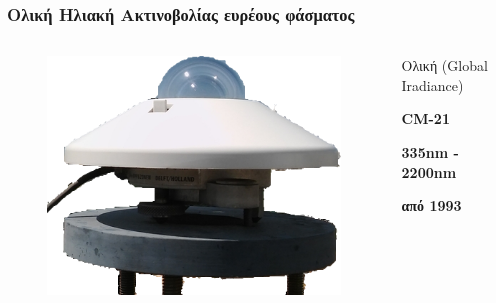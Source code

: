 \documentclass[hyperref={pdfpagelabels=false}]{beamer}
\newenvironment{topcolumns}{\begin{columns}[t]}{\end{columns}}
\begin{document}
\begin{frame}%
\frametitle{Ολική Ηλιακή Ακτινοβολίας ευρέους φάσματος}

\begin{topcolumns}%

\column{5.5cm}

\begin{figure}
    \includegraphics[width=1.0\textwidth]{files/cm21}
\end{figure}

\column{5.5cm}
\begin{block}{Ολική (Global Iradiance)}
    \begin{description}[leftmargin=0em]
        \item[Πυρανόμετρο:] \textbf{CM-21}
        \item[Φάσμα:]       \textbf{335nm - 2200nm}
        \item[Λειτουργία:]  \textbf{από 1993}
    \end{description}
\end{block}
\end{topcolumns}%

\end{frame}
\end{document}
